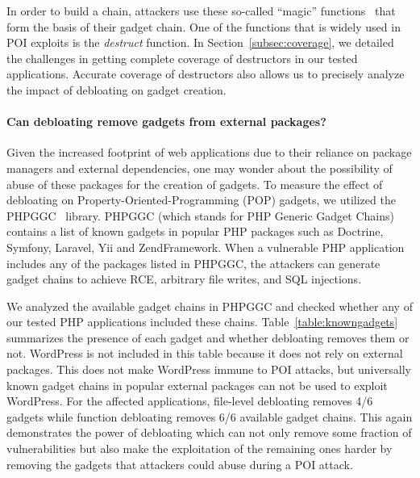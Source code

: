 In order to build a chain, attackers use these so-called ``magic''
functions~\cite{PHPWakeup} that form the basis of their gadget chain. One of
the functions that is widely used in POI exploits is the \textit{destruct}
function. In Section~\ref{subsec:coverage}, we detailed the challenges in
getting complete coverage of destructors in our tested applications. Accurate
coverage of destructors also allows us to precisely analyze the impact of
debloating on gadget creation.




\paragraph{Can debloating remove gadgets from external packages?}

Given the increased footprint of web applications due to their reliance
on package managers and external dependencies, one may wonder about the
possibility of abuse of these packages for the creation of gadgets. To
measure the effect of debloating on Property-Oriented-Programming (POP)
gadgets, we utilized the PHPGGC~\cite{PHPGGC} library. PHPGGC (which stands
for PHP Generic Gadget Chains) contains a list of known gadgets in popular
PHP packages such as Doctrine, Symfony, Laravel, Yii and ZendFramework. When
a vulnerable PHP application includes any of the packages listed in PHPGGC,
the attackers can generate gadget chains to achieve RCE, arbitrary file
writes, and SQL injections.

We analyzed the available gadget chains in PHPGGC and
checked whether any of our tested PHP applications included these
chains. Table~\ref{table:knowngadgets} summarizes the presence of each gadget
and whether debloating removes them or not. WordPress is not included in this table because it does not rely on external packages.
This does not make WordPress immune to POI attacks, but universally known gadget chains in popular external packages can not be used to exploit WordPress.
For the affected applications, file-level debloating removes 4/6 gadgets while function debloating removes
6/6 available gadget chains. This again demonstrates the power of debloating
which can not only remove some fraction of vulnerabilities but also make
the exploitation of the remaining ones harder by removing the gadgets that
attackers could abuse during a POI attack.


